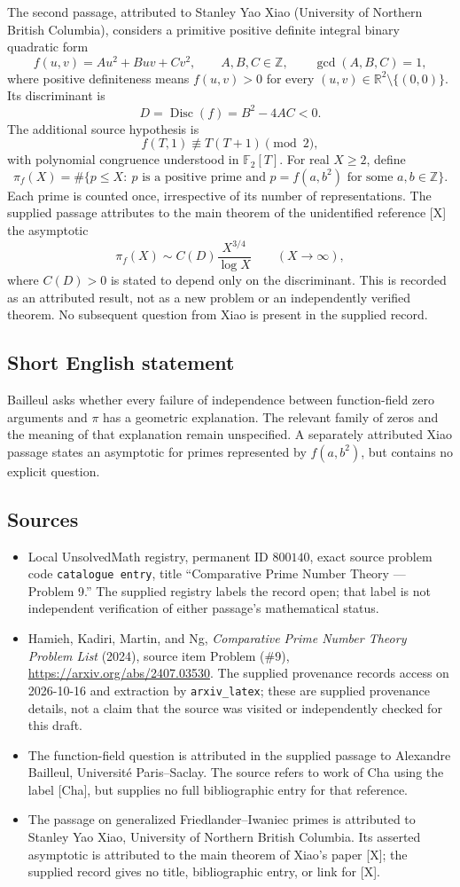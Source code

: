 \documentclass[11pt]{article}
\newcommand{\Z}{\mathbb{Z}}
\newcommand{\R}{\mathbb{R}}
\newcommand{\F}{\mathbb{F}}
\begin{document}
The second passage, attributed to Stanley Yao Xiao (University of Northern British Columbia), considers a primitive positive definite integral binary quadratic form
\[
f(u,v)=Au^2+Buv+Cv^2,\qquad A,B,C\in\Z,\qquad \gcd(A,B,C)=1,
\]
where positive definiteness means \(f(u,v)>0\) for every \((u,v)\in\R^2\setminus\{(0,0)\}\). Its discriminant is
\[
D=\operatorname{Disc}(f)=B^2-4AC<0.
\]
The additional source hypothesis is
\[
f(T,1)\not\equiv T(T+1)\pmod 2,
\]
with polynomial congruence understood in \(\F_2[T]\). For real \(X\geq2\), define
\[
\pi_f(X)=\#\bigl\{p\leq X:\ p\text{ is a positive prime and }p=f(a,b^2)\text{ for some }a,b\in\Z\bigr\}.
\]
Each prime is counted once, irrespective of its number of representations. The supplied passage attributes to the main theorem of the unidentified reference [X] the asymptotic
\[
\pi_f(X)\sim C(D)\frac{X^{3/4}}{\log X}\qquad(X\to\infty),
\]
where \(C(D)>0\) is stated to depend only on the discriminant. This is recorded as an attributed result, not as a new problem or an independently verified theorem. No subsequent question from Xiao is present in the supplied record.
\subsection{Short English statement}
Bailleul asks whether every failure of independence between function-field zero arguments and \(\pi\) has a geometric explanation. The relevant family of zeros and the meaning of that explanation remain unspecified. A separately attributed Xiao passage states an asymptotic for primes represented by \(f(a,b^2)\), but contains no explicit question.
\subsection{Sources}
\begin{itemize}
\item Local UnsolvedMath registry, permanent ID \(800140\), exact source problem code \texttt{catalogue entry}, title ``Comparative Prime Number Theory --- Problem 9.'' The supplied registry labels the record open; that label is not independent verification of either passage's mathematical status.
\item Hamieh, Kadiri, Martin, and Ng, \emph{Comparative Prime Number Theory Problem List} (2024), source item Problem (\#9), \url{https://arxiv.org/abs/2407.03530}. The supplied provenance records access on 2026-10-16 and extraction by \texttt{arxiv\_latex}; these are supplied provenance details, not a claim that the source was visited or independently checked for this draft.
\item The function-field question is attributed in the supplied passage to Alexandre Bailleul, Université Paris--Saclay. The source refers to work of Cha using the label [Cha], but supplies no full bibliographic entry for that reference.
\item The passage on generalized Friedlander--Iwaniec primes is attributed to Stanley Yao Xiao, University of Northern British Columbia. Its asserted asymptotic is attributed to the main theorem of Xiao's paper [X]; the supplied record gives no title, bibliographic entry, or link for [X].
\end{itemize}
\end{document}
